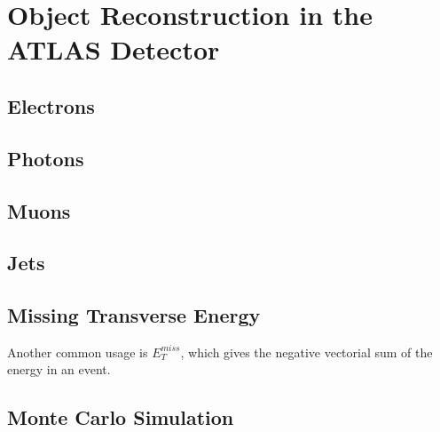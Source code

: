 \chapter{Object Reconstruction in the ATLAS Detector} %

\label{ch:reconstruction} 


\section{Electrons}
\section{Photons}
\section{Muons}
\label{sec:reco_muons}
\section{Jets}
\section{Missing Transverse Energy}
Another common usage is $E_T^{miss}$, which gives the negative vectorial sum of the energy in an event. 


\section{Monte Carlo Simulation}


